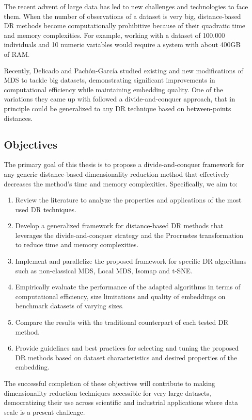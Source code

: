 The recent advent of large data has led to new challenges and technologies to face them. When the number of observations of a dataset is very big, distance-based DR methods become computationally prohibitive because of their quadratic time and memory complexities. For example, working with a dataset of 100,000 individuals and 10 numeric variables would require a system with about 400GB of RAM.

Recently, Delicado and Pachón-García \cite{Delicado2024MDSBigData} studied existing and new modifications of MDS to tackle big datasets, demonstrating significant improvements in computational efficiency while maintaining embedding quality. One of the variations they came up with followed a divide-and-conquer approach, that in principle could be generalized to any DR technique based on between-points distances.

\subsection{Objectives}

The primary goal of this thesis is to propose a divide-and-conquer framework for any generic distance-based dimensionality reduction method that effectively decreases the method's time and memory complexities. Specifically, we aim to:

\begin{enumerate}
    \item Review the literature to analyze the properties and applications of the most used DR techniques.
    \item Develop a generalized framework for distance-based DR methods that leverages the divide-and-conquer strategy and the Procrustes transformation to reduce time and memory complexities.
    \item Implement and parallelize the proposed framework for specific DR algorithms such as non-classical MDS, Local MDS, Isomap and t-SNE.
    \item Empirically evaluate the performance of the adapted algorithms in terms of computational efficiency, size limitations and quality of embeddings on benchmark datasets of varying sizes.
    \item Compare the results with the traditional counterpart of each tested DR method.
    \item Provide guidelines and best practices for selecting and tuning the proposed DR methods based on dataset characteristics and desired properties of the embedding.
\end{enumerate}

The successful completion of these objectives will contribute to making  dimensionality reduction techniques accessible for very large datasets, democratizing their use across scientific and industrial applications where data scale is a present challenge.